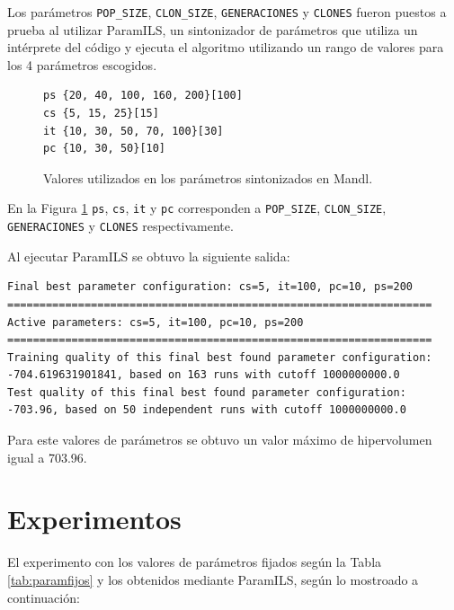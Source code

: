 \documentclass{llncs}
\begin{document}
Los parámetros \texttt{POP\_SIZE}, \texttt{CLON\_SIZE}, \texttt{GENERACIONES} y \texttt{CLONES} fueron puestos a prueba al utilizar ParamILS, un sintonizador de parámetros que utiliza un intérprete del código y ejecuta el algoritmo utilizando un rango de valores para los 4 parámetros escogidos.

\begin{figure}[!htb]
\begin{verbatim}
ps {20, 40, 100, 160, 200}[100]
cs {5, 15, 25}[15]
it {10, 30, 50, 70, 100}[30]
pc {10, 30, 50}[10]
\end{verbatim}
\caption{Valores utilizados en los parámetros sintonizados en Mandl.}
\label{fig:paramsintonizados}
\end{figure}

En la Figura \ref{fig:paramsintonizados} \texttt{ps}, \texttt{cs}, \texttt{it} y \texttt{pc} corresponden a \texttt{POP\_SIZE}, \texttt{CLON\_SIZE}, \texttt{GENERACIONES} y \texttt{CLONES} respectivamente.

\newpage

Al ejecutar ParamILS se obtuvo la siguiente salida:

\begin{small}
\begin{verbatim}
Final best parameter configuration: cs=5, it=100, pc=10, ps=200
==================================================================
Active parameters: cs=5, it=100, pc=10, ps=200
==================================================================
Training quality of this final best found parameter configuration: 
-704.619631901841, based on 163 runs with cutoff 1000000000.0
Test quality of this final best found parameter configuration: 
-703.96, based on 50 independent runs with cutoff 1000000000.0
\end{verbatim}
\end{small}

Para este valores de parámetros se obtuvo un valor máximo de hipervolumen igual a 703.96.

\section{Experimentos}

El experimento con los valores de parámetros fijados según la Tabla \ref{tab:paramfijos} y los obtenidos mediante ParamILS, según lo mostroado a continuación:
\end{document}
